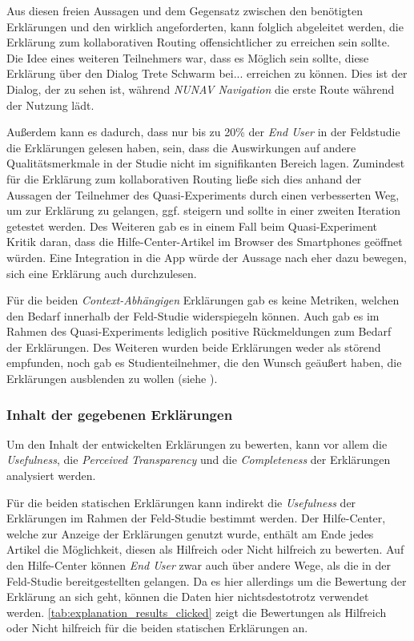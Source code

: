 Aus diesen freien Aussagen und dem Gegensatz zwischen den benötigten Erklärungen und den wirklich angeforderten, kann folglich abgeleitet werden, die Erklärung zum kollaborativen Routing offensichtlicher zu erreichen sein sollte. Die Idee eines weiteren Teilnehmers war, dass es Möglich sein sollte, diese Erklärung über den Dialog \glqq Trete Schwarm bei...\grqq{} erreichen zu können. Dies ist der Dialog, der zu sehen ist, während \textit{NUNAV Navigation} die erste Route während der Nutzung lädt.

Außerdem kann es dadurch, dass nur bis zu 20\% der \textit{End User} in der Feldstudie die Erklärungen gelesen haben, sein, dass die Auswirkungen auf andere Qualitätsmerkmale in der Studie nicht im signifikanten Bereich lagen. Zumindest für die Erklärung zum kollaborativen Routing ließe sich dies anhand der Aussagen der Teilnehmer des Quasi-Experiments durch einen verbesserten Weg, um zur Erklärung zu gelangen, ggf. steigern und sollte in einer zweiten Iteration getestet werden. Des Weiteren gab es in einem Fall beim Quasi-Experiment Kritik daran, dass die Hilfe-Center-Artikel im Browser des Smartphones geöffnet würden. Eine Integration in die App würde der Aussage nach eher dazu bewegen, sich eine Erklärung auch durchzulesen.

Für die beiden \textit{Context-Abhängigen} Erklärungen gab es keine Metriken, welchen den Bedarf innerhalb der Feld-Studie widerspiegeln können. Auch gab es im Rahmen des Quasi-Experiments lediglich positive Rückmeldungen zum Bedarf der Erklärungen. Des Weiteren wurden beide Erklärungen weder als störend empfunden, noch gab es Studienteilnehmer, die den Wunsch geäußert haben, die Erklärungen ausblenden zu wollen (siehe ). %

\subsubsection{Inhalt der gegebenen Erklärungen}

Um den Inhalt der entwickelten Erklärungen zu bewerten, kann vor allem die \textit{Usefulness}, die \textit{Perceived Transparency} und die \textit{Completeness} der Erklärungen analysiert werden.

Für die beiden statischen Erklärungen kann indirekt die \textit{Usefulness} der Erklärungen im Rahmen der Feld-Studie bestimmt werden. Der Hilfe-Center, welche zur Anzeige der Erklärungen genutzt wurde, enthält am Ende jedes Artikel die Möglichkeit, diesen als \glqq Hilfreich\grqq{} oder \glqq Nicht hilfreich\grqq{} zu bewerten. Auf den Hilfe-Center können \textit{End User} zwar auch über andere Wege, als die in der Feld-Studie bereitgestellten gelangen. Da es hier allerdings um die Bewertung der Erklärung an sich geht, können die Daten hier nichtsdestotrotz verwendet werden. \autoref{tab:explanation_results_clicked} zeigt die Bewertungen als \glqq Hilfreich\grqq{} oder \glqq Nicht hilfreich\grqq{} für die beiden statischen Erklärungen an.

